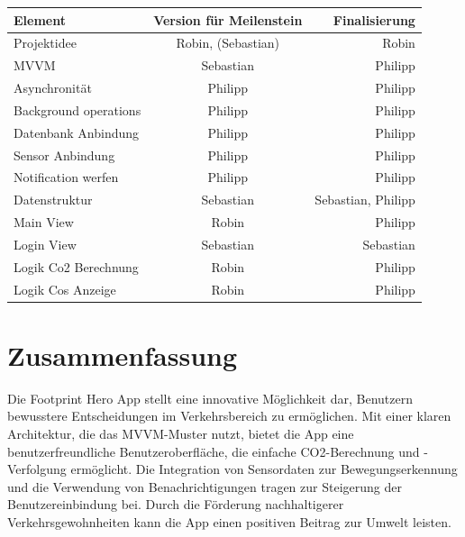 \documentclass{article}
\begin{document}
\begin{tabular}[h]{l|c|r}
Element & Version für Meilenstein & Finalisierung \\
\hline
Projektidee & Robin, (Sebastian) & Robin\\
\hline
MVVM & Sebastian & Philipp\\
\hline
Asynchronität & Philipp & Philipp\\
\hline
Background operations & Philipp & Philipp\\
\hline
Datenbank Anbindung & Philipp & Philipp\\
\hline
Sensor Anbindung & Philipp & Philipp\\
\hline
Notification werfen & Philipp & Philipp\\
\hline
Datenstruktur & Sebastian & Sebastian, Philipp\\
\hline
Main View & Robin & Philipp\\
\hline
Login View & Sebastian & Sebastian\\
\hline
Logik Co2 Berechnung & Robin & Philipp\\
\hline
Logik Cos Anzeige & Robin & Philipp\\
\end{tabular}

    


\section{Zusammenfassung}

Die Footprint Hero App stellt eine innovative Möglichkeit dar, Benutzern bewusstere Entscheidungen im Verkehrsbereich zu ermöglichen. Mit einer klaren Architektur, die das MVVM-Muster nutzt, bietet die App eine benutzerfreundliche Benutzeroberfläche, die einfache CO2-Berechnung und -Verfolgung ermöglicht. Die Integration von Sensordaten zur Bewegungserkennung und die Verwendung von Benachrichtigungen tragen zur Steigerung der Benutzereinbindung bei. Durch die Förderung nachhaltigerer Verkehrsgewohnheiten kann die App einen positiven Beitrag zur Umwelt leisten.
\end{document}
